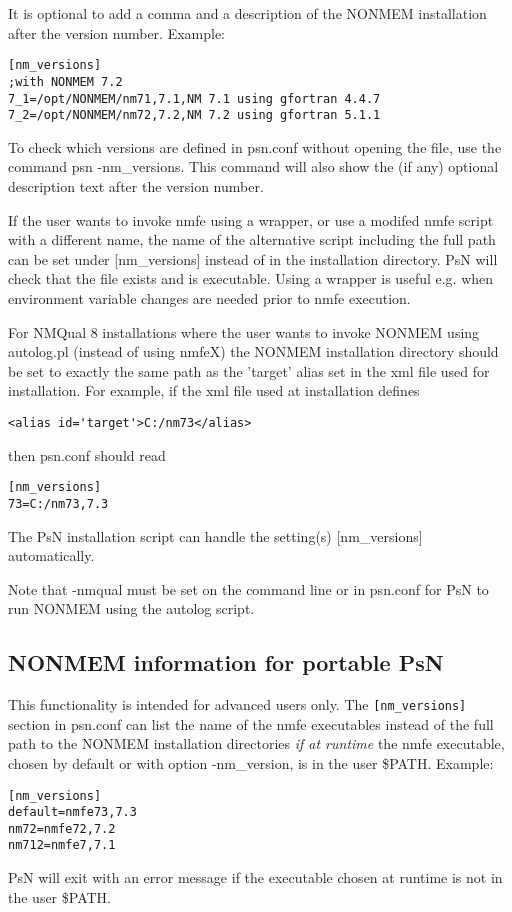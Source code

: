 It is optional to add a comma and a description of the NONMEM installation after the version number. Example:
\begin{verbatim}
[nm_versions]
;with NONMEM 7.2 
7_1=/opt/NONMEM/nm71,7.1,NM 7.1 using gfortran 4.4.7
7_2=/opt/NONMEM/nm72,7.2,NM 7.2 using gfortran 5.1.1
\end{verbatim}

To check which versions are defined in psn.conf without opening the file, use the command psn -nm\_versions.
This command will also show the (if any) optional description text after the version number.

If the user wants to invoke nmfe using a wrapper, or use a modifed nmfe script with a different name, the name of the alternative script including the full path can be set under [nm\_versions] instead of in the installation directory. PsN will check that the file exists and is executable. 
Using a wrapper is useful e.g. when environment variable changes are needed prior to nmfe execution.

For NMQual 8 installations where the user wants to invoke NONMEM using autolog.pl (instead of using nmfeX) the NONMEM installation directory should be set to exactly the same path as the 'target' alias set in the xml file used for installation. 
For example, if the xml file used at installation defines   
\begin{verbatim}
<alias id='target'>C:/nm73</alias>
\end{verbatim}
then psn.conf should read
\begin{verbatim}
[nm_versions]
73=C:/nm73,7.3
\end{verbatim}
The PsN installation script can handle the setting(s) [nm\_versions] automatically.

Note that -nmqual must be set on the command line or in psn.conf for PsN to run NONMEM using the autolog script.

\subsection{NONMEM information for portable PsN}
This functionality is intended for advanced users only. The
\verb|[nm_versions]|
section in psn.conf can list the name of the nmfe executables instead of the full path to the NONMEM installation directories \emph{if at runtime} the nmfe executable, chosen by default or with option -nm\_version, is in the user \$PATH. Example:
\begin{verbatim}
[nm_versions]
default=nmfe73,7.3
nm72=nmfe72,7.2
nm712=nmfe7,7.1
\end{verbatim}
PsN will exit with an error message if the executable chosen at runtime is not in the user \$PATH.

